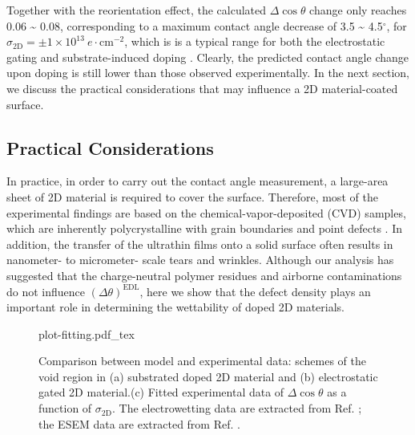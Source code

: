 Together with the reorientation effect, the calculated \(\Delta \cos
\theta\) change only reaches 0.06 \textasciitilde{} 0.08, corresponding to a maximum
contact angle decrease of 3.5 \textasciitilde{} 4.5\(^{\circ}\), for
\(\sigma_{\mathrm{2D}}=\pm1\times10^{13}\ e\cdot \mathrm{cm}^{-2}\),
which is is a typical range for both the electrostatic gating
\cite{Hong_2016_mechanism} and substrate-induced doping
\cite{Ashraf_2016_doping}. Clearly, the predicted contact angle
change upon doping is still lower than those observed
experimentally. In the next section, we discuss the practical
considerations that may influence a 2D material-coated surface.


\subsection{Practical Considerations}
\label{sec:orgb997597}

In practice, in order to
carry out the contact angle measurement, a large-area sheet of 2D
material is required to cover the surface. Therefore, most of the
experimental findings are based on the chemical-vapor-deposited (CVD)
samples, which are inherently polycrystalline with grain boundaries
and point defects \cite{Banhart_2011_defect}.  In addition, the transfer
of the ultrathin films onto a solid surface often results in
nanometer- to micrometer- scale tears and wrinkles. Although our
analysis has suggested that the charge-neutral polymer residues and
airborne contaminations do not influence \((\Delta
\theta)^{\mathrm{EDL}}\), here we show that the defect density plays an
important role in determining the wettability of doped 2D
materials.

\begin{figure}[!htbp]
  \centering
  {plot-fitting.pdf_tex}
\caption{\label{fig:wet-f-nc-exp} Comparison between model and
  experimental data: schemes of the void region in (a) substrated
  doped 2D material and (b) electrostatic gated 2D material.(c) Fitted
  experimental data of \(\Delta\cos\theta\) as a function of
  \(\sigma_{\mathrm{2D}}\). The electrowetting data are extracted from
  Ref. \cite{Hong_2016_mechanism}; the ESEM data are extracted from
  Ref. \cite{Ashraf_2016_doping}.}
\end{figure}

